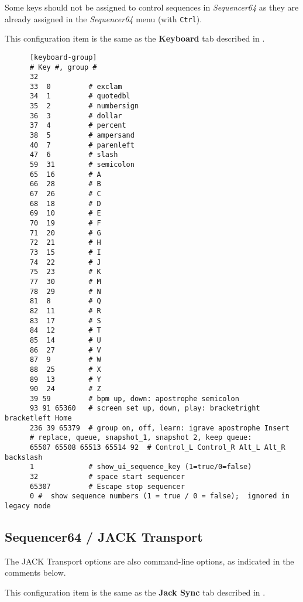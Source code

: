    Some keys should not be assigned to control sequences in \textsl{Sequencer64} as
   they are already assigned in the \textsl{Sequencer64} menu (with \texttt{Ctrl}). 

   This configuration item is the same as the 
   \textbf{Keyboard} tab described in
   .

   \begin{verbatim}
      [keyboard-group]
      # Key #, group # 
      32
      33  0         # exclam
      34  1         # quotedbl
      35  2         # numbersign
      36  3         # dollar
      37  4         # percent
      38  5         # ampersand
      40  7         # parenleft
      47  6         # slash
      59  31        # semicolon
      65  16        # A
      66  28        # B
      67  26        # C
      68  18        # D
      69  10        # E
      70  19        # F
      71  20        # G
      72  21        # H
      73  15        # I
      74  22        # J
      75  23        # K
      77  30        # M
      78  29        # N
      81  8         # Q
      82  11        # R
      83  17        # S
      84  12        # T
      85  14        # U
      86  27        # V
      87  9         # W
      88  25        # X
      89  13        # Y
      90  24        # Z
      39 59         # bpm up, down: apostrophe semicolon
      93 91 65360   # screen set up, down, play: bracketright bracketleft Home
      236 39 65379  # group on, off, learn: igrave apostrophe Insert
      # replace, queue, snapshot_1, snapshot 2, keep queue:
      65507 65508 65513 65514 92  # Control_L Control_R Alt_L Alt_R backslash
      1             # show_ui_sequence_key (1=true/0=false)
      32            # space start sequencer
      65307         # Escape stop sequencer
      0 #  show sequence numbers (1 = true / 0 = false);  ignored in legacy mode
   \end{verbatim}

\subsection{Sequencer64 / JACK Transport}
\label{subsec:seq64_rc_file_jack_transport}

   The JACK Transport options are also command-line options, as indicated in
   the comments below.

   This configuration item is the same as the 
   \textbf{Jack Sync} tab described in
   .

